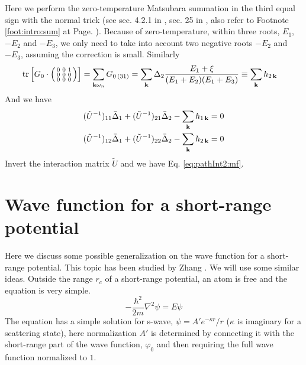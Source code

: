 Here we perform the zero-temperature Matsubara summation  in the third equal sign with the normal trick (see sec. 4.2.1 in \cite{Altland}, sec. 25 in \cite{Fetter}, also refer to Footnote \ref{foot:intro:sum} at Page. \pageref{foot:intro:sum}). Because of zero-temperature,  within three roots, $E_{1}$, $-E_{2}$ and $-E_{3}$, we only need to take into account two negative roots $-E_{2}$ and $-E_{3}$, assuming the correction is small. 
Similarly
\begin{equation}
\begin{split}
\text{tr}\left[{G_{0}}\cdot\left(\begin{smallmatrix}0&0&1\\0&0&0\\0&0&0\end{smallmatrix}\right)\right]&=\sum_{\mathbf{k}\omega_{n}}G_{0\,(31)}
=\sum_{\mathbf{k}}\Delta_{2}\frac{E_{1}+\xi}{(E_{1}+E_{2})(E_{1}+E_{3})}\equiv\sum_{\mathbf{k}}h_{2\,\mathbf{k}}
\end{split}
\end{equation}
And we have 
 \begin{align*}
(\tilde{U}^{-1})_{11}\bar{\Delta}_{1}+(\tilde{U}^{-1})_{21}\bar{\Delta}_{2}-\sum_{\mathbf{k}}h_{1\,\mathbf{k}}=0\\
(\tilde{U}^{-1})_{12}\bar{\Delta}_{1}+(\tilde{U}^{-1})_{22}\bar{\Delta}_{2}-\sum_{\mathbf{k}}h_{2\,\mathbf{k}}=0
 \end{align*}
Invert the interaction matrix $\tilde{U}$ and we have Eq.  \ref{eq:pathInt2:mf}.


\section{Wave function for a short-range potential}\label{sec:pathInt2:short-range}
Here we discuss some possible generalization on the wave function for a short-range potential.  This topic has been studied by Zhang \cite{shizhongUniv}. We will use some similar ideas.  Outside the range $r_{c}$ of a short-range potential,  an atom is free and  the  \sch equation is very simple.
\begin{equation}
-\frac{\hbar^{2}}{2m}\nabla^{2}\psi=E\psi
\end{equation}
The equation has a simple solution for s-wave, $\psi=A'{e^{-\kappa{r}}}/{r}$ ($\kappa$ is imaginary for a scattering state), here normalization $A'$ is determined  by connecting it with the short-range part of the wave function, $\varphi_0$ and then requiring the full wave function normalized to $1$. 

